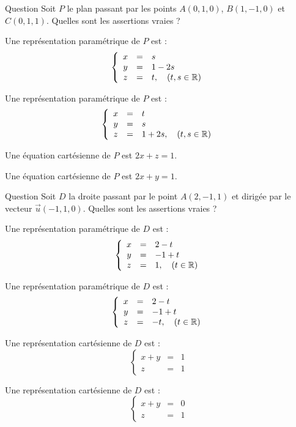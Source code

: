 \begin{multi}[multiple,feedback=
{\(P\) est le plan passant par \(A\) et dirigé par les vecteurs \(\overrightarrow{AB}\) et \(\overrightarrow{AC}\).
}]{Question}
Soit \(P\) le plan passant par les points \(A(0,1,0)\), \(B(1,-1,0)\) et \(C(0,1,1)\). Quelles sont les assertions vraies ?

    \item* Une représentation paramétrique de \(P\) est :
\[\left\{\begin{array}{ccl}x&=&s\\y&=&1-2s\\ z&=&t,\quad (t,s\in \mathbb{R})\end{array}\right.\]
    \item Une représentation paramétrique de \(P\) est :
\[\left\{\begin{array}{ccl}x&=&t\\y&=&s\\ z&=&1+2s,\quad (t,s\in \mathbb{R})\end{array}\right.\]
    \item Une équation cartésienne de \(P\) est \(2x+z=1\).
    \item* Une équation cartésienne de \(P\) est \(2x+y=1\).
\end{multi}


\begin{multi}[multiple,feedback=
{On peut trouver une représentation cartésienne, à partir d'une représentation   paramétrique en éliminant le paramètre.
}]{Question}
Soit \(D\) la droite passant par le point \(A(2,-1,1)\) et dirigée par le vecteur \(\vec{u}(-1,1,0)\). Quelles sont les assertions vraies ?

    \item* Une représentation paramétrique de \(D\) est :
\[\left\{\begin{array}{ccl}x&=&2-t\\y&=&-1+t\\ z&=&1,\quad (t\in \mathbb{R}) \end{array}\right.\]
    \item Une représentation paramétrique de \(D\) est :
\[\left\{\begin{array}{ccl}x&=&2-t\\y&=&-1+t\\ z&=&-t,\quad (t\in \mathbb{R})\end{array}\right.\]
    \item* Une représentation cartésienne de \(D\) est :
\[\left\{\begin{array}{ccl}x+y&=&1\\z&=&1 \end{array}\right.\]
    \item Une représentation cartésienne de \(D\) est :
\[\left\{\begin{array}{ccl}x+y&=&0\\z&=&1 \end{array}\right.\]
\end{multi}



